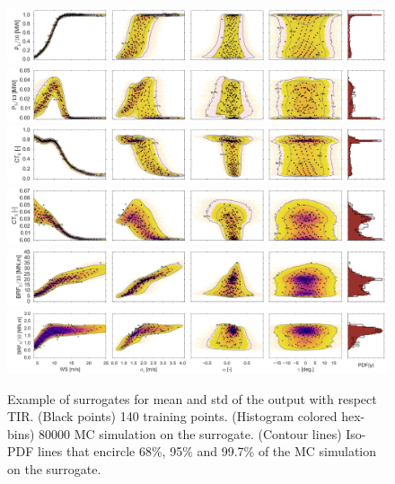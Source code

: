 \documentclass[preprint,12pt]{elsarticle}
\begin{document}
\begin{figure}[h!]
\begin{centering}
\includegraphics[width=\linewidth]{Figures/Surrgotes_20-fold/P_E_MC_PCE_last_row.jpg} \\
\includegraphics[width=\linewidth]{Figures/Surrgotes_20-fold/P_S_MC_PCE_last_row.jpg} \\
\includegraphics[width=\linewidth]{Figures/Surrgotes_20-fold/CT_E_MC_PCE_last_row.jpg} \\
\includegraphics[width=\linewidth]{Figures/Surrgotes_20-fold/CT_S_MC_PCE_last_row.jpg}\\
\includegraphics[width=\linewidth]{Figures/Surrgotes_20-fold/BRFBM_EFL_M12_E_MC_PCE_last_row.jpg} \\
\includegraphics[width=\linewidth]{Figures/Surrgotes_20-fold/BRFBM_EFL_M12_S_MC_PCE_last_row.jpg}
\caption{Example of surrogates for mean and std of the output with respect TIR. (Black points) 140 training points. (Histogram colored hex-bins) 80000 MC simulation on the surrogate. (Contour lines) Iso-PDF lines that encircle 68\%, 95\% and 99.7\% of the MC simulation on the surrogate.}
\label{fig_y_hat_E_V}
\end{centering}
\end{figure}
\end{document}
